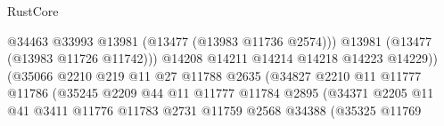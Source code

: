 \begin{lexlean}{RustCore}
\begin{coremodule}
                                                      @34463
                                                      @33993
                                                      @13981
                                                      (@13477 (@13983 @11736 @2574)))
                                                    @13981
                                                    (@13477 (@13983 @11726 @11742)))
                                                  @14208
                                                  @14211
                                                  @14214
                                                  @14218
                                                  @14223
                                                  @14229))
                                              (@35066
                                                @2210
                                                @219
                                                @11
                                                @27
                                                @11788
                                                @2635
                                                (@34827
                                                  @2210
                                                  @11
                                                  @11777
                                                  @11786
                                                  (@35245
                                                    @2209
                                                    @44
                                                    @11
                                                    @11777
                                                    @11784
                                                    @2895
                                                    (@34371
                                                      @2205
                                                      @11
                                                      @41
                                                      @3411
                                                      @11776
                                                      @11783
                                                      @2731
                                                      @11759
                                                      @2568
                                                      @34388
                                                      (@35325
                                                        @11769

\end{coremodule}
\end{lexlean}
